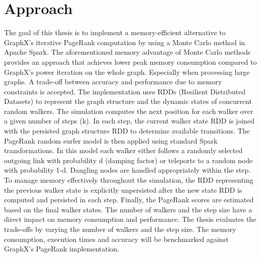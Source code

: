 \documentclass[a4paper,12pt]{article}
\begin{document}
\section{Approach}
The goal of this thesis is to implement a memory-efficient alternative to GraphX's iterative PageRank computation by using a Monte Carlo method in Apache Spark. The aforementioned memory advantage of Monte Carlo methods provides an approach that achieves lower peak memory consumption compared to GraphX's power iteration on the whole graph. Especially when processing large graphs. A trade-off between accuracy and performance due to memory constraints is accepted. 
The implementation uses RDDs (Resilient Distributed Datasets) to represent the graph structure and the dynamic states of concurrent random walkers. The simulation computes the next position for each walker over a given number of steps (k). In each step, the current walker state RDD is joined with the persisted graph structure RDD to determine available transitions. The PageRank random surfer model is then applied using standard Spark transformations. In this model each walker either follows a randomly selected outgoing link with probability d (damping factor) or teleports to a random node with probability 1-d. Dangling nodes are handled appropriately within the step. To manage memory effectively throughout the simulation, the RDD representing the previous walker state is explicitly unpersisted after the new state RDD is computed and persisted in each step. Finally, the PageRank scores are estimated based on the final walker states. The number of walkers and the step size have a direct impact on memory consumption and performance. The thesis evaluates the trade-offs by varying the number of walkers and the step size. The memory consumption, execution times and accuracy will be benchmarked against GraphX's PageRank implementation.




\end{document}
